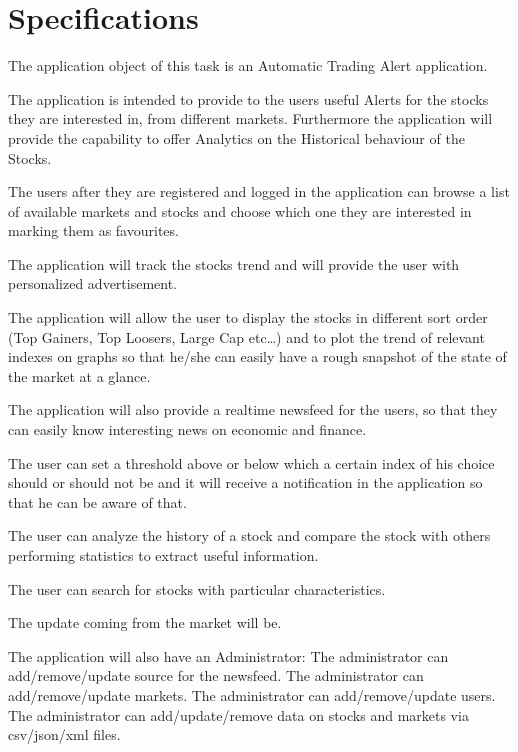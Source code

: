 \chapter{Specifications}

The application object of this task is an Automatic Trading Alert application.

The application is intended to provide to the users useful Alerts for the
stocks they are interested in, from different markets. Furthermore the
application will provide the capability to offer Analytics on the Historical
behaviour of the Stocks.

The users after they are registered and logged in the application can browse a
list of available markets and stocks and choose which one they are interested
in marking them as favourites.

The application will track the stocks trend and will provide the user with
personalized advertisement.

The application will allow the user to display the stocks in different sort
order (Top Gainers, Top Loosers, Large Cap etc\ldots) and to plot the trend of
relevant indexes on graphs so that he/she can easily have a rough snapshot of
the state of the market at a glance.

The application will also provide a realtime newsfeed for the users, so that
they can easily know interesting news on economic and finance.

The user can set a threshold above or below which a certain index of his choice
should or should not be and it will receive a notification in the application
so that he can be aware of that.

The user can analyze the history of a stock and compare the stock with others
performing statistics to extract useful information.

The user can search for stocks with particular characteristics.

The update coming from the market will be.

The application will also have an Administrator: The administrator can
add/remove/update source for the newsfeed. The administrator can
add/remove/update markets. The administrator can add/remove/update users. The
administrator can add/update/remove data on stocks and markets via csv/json/xml
files.
